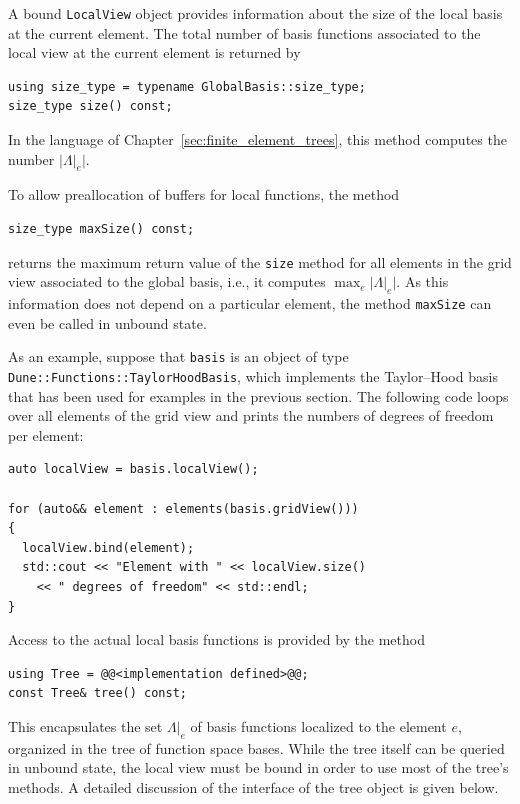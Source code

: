 \documentclass[a4paper,10pt,headings=normal,bibliography=totoc]{scrartcl}
\newcommand{\cpp}[1]{\lstinline[basicstyle=\ttfamily]!#1!}
\newcommand{\abs}[1]{{\lvert#1\rvert}}
\begin{document}
A bound \cpp{LocalView} object provides information
about the size of the local basis at the current element.
The total number of basis functions associated to the
local view at the current element is returned by
\begin{lstlisting}[style=Interface]
using size_type = typename GlobalBasis::size_type;
size_type size() const;
\end{lstlisting}
In the language of Chapter~\ref{sec:finite_element_trees}, this method computes
the number $\abs{\Lambda|_e}$.

To allow preallocation of buffers for local functions, the method
\begin{lstlisting}[style=Interface]
size_type maxSize() const;
\end{lstlisting}
returns the maximum return value of the
\cpp{size} method for all elements in the grid view
associated to the global basis, i.e., it computes $\max_e \abs{\Lambda|_e}$.
As this information does not depend on a particular element,
the method \cpp{maxSize} can even be called in unbound state.

As an example, suppose that \cpp{basis} is an object of type \cpp{Dune::Functions::TaylorHoodBasis},
which implements the Taylor--Hood basis that has been used for examples in the previous section.
The following code loops over all elements of the grid view and prints the numbers
of degrees of freedom per element:
\begin{lstlisting}[style=example]
auto localView = basis.localView();

for (auto&& element : elements(basis.gridView()))
{
  localView.bind(element);
  std::cout << "Element with " << localView.size()
    << " degrees of freedom" << std::endl;
}
\end{lstlisting}


Access to the actual local basis functions is provided
by the method
\begin{lstlisting}[style=Interface]
using Tree = @@<implementation defined>@@;
const Tree& tree() const;
\end{lstlisting}
This encapsulates the set $\Lambda|_e$ of basis functions localized to the
element $e$, organized in the tree of function space bases.
While the tree  itself can be queried in unbound state,
the local view must be bound in order to use most of the
tree's methods.
A detailed discussion of the interface of the tree object is
given below.
\end{document}
